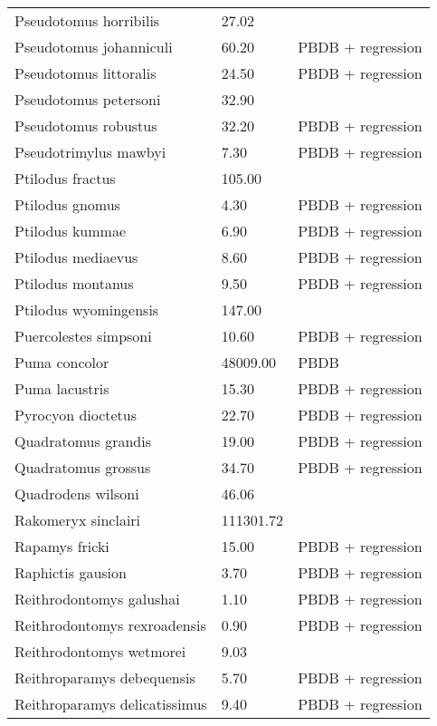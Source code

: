 \documentclass{article}
\begin{document}
\begin{center}
\begin{longtable}{p{} p{} p{}}
    Pseudotomus horribilis & 27.02 & \cite{Carraway2010} \\ 
    Pseudotomus johanniculi & 60.20 & PBDB + regression \\ 
    Pseudotomus littoralis & 24.50 & PBDB + regression \\ 
    Pseudotomus petersoni & 32.90 & \cite{Carraway2010} \\ 
    Pseudotomus robustus & 32.20 & PBDB + regression \\ 
    Pseudotrimylus mawbyi & 7.30 & PBDB + regression \\ 
    Ptilodus fractus & 105.00 & \cite{Wilson2012} \\ 
    Ptilodus gnomus & 4.30 & PBDB + regression \\ 
    Ptilodus kummae & 6.90 & PBDB + regression \\ 
    Ptilodus mediaevus & 8.60 & PBDB + regression \\ 
    Ptilodus montanus & 9.50 & PBDB + regression \\ 
    Ptilodus wyomingensis & 147.00 & \cite{Wilson2012} \\ 
    Puercolestes simpsoni & 10.60 & PBDB + regression \\ 
    Puma concolor & 48009.00 & PBDB \\ 
    Puma lacustris & 15.30 & PBDB + regression \\ 
    Pyrocyon dioctetus & 22.70 & PBDB + regression \\ 
    Quadratomus grandis & 19.00 & PBDB + regression \\ 
    Quadratomus grossus & 34.70 & PBDB + regression \\ 
    Quadrodens wilsoni & 46.06 & \cite{Tomiya2013} \\ 
    Rakomeryx sinclairi & 111301.72 & \cite{Tomiya2013} \\ 
    Rapamys fricki & 15.00 & PBDB + regression \\ 
    Raphictis gausion & 3.70 & PBDB + regression \\ 
    Reithrodontomys galushai & 1.10 & PBDB + regression \\ 
    Reithrodontomys rexroadensis & 0.90 & PBDB + regression \\ 
    Reithrodontomys wetmorei & 9.03 & \cite{Tomiya2013} \\ 
    Reithroparamys debequensis & 5.70 & PBDB + regression \\ 
    Reithroparamys delicatissimus & 9.40 & PBDB + regression \\ 

\end{longtable}
\end{center}
\end{document}
